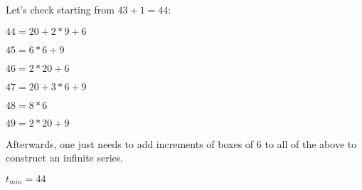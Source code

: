 \documentclass{article}
\begin{document}
\medskip

Let's check starting from $43 + 1 = 44$:

$44 = 20 + 2 * 9 +6$

$45 = 6 * 6 + 9$

$46 = 2 * 20 + 6$

$47 = 20 + 3 * 6 + 9$

$48 = 8 * 6$

$49 = 2 * 20 + 9$

Afterwards, one just needs to add increments of boxes of $6$ to all of the above to construct an infinite series.

\medskip

$t_{min} = 44$
\end{document}
